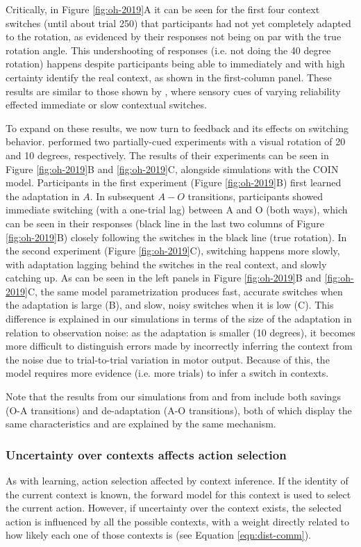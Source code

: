 \documentclass[a4paper,doc,floatsintext,natbib]{apa6}
\def \fref #1{Figure \ref{#1}}     %
\def \eref #1{Equation \ref{#1}}   %
\begin{document}
Critically, in \fref{fig:oh-2019}A it can be seen for the first four context switches (until about trial 250) that participants had not yet completely adapted to the rotation, as evidenced by their responses not being on par with the true rotation angle. This undershooting of responses (i.e. not doing the 40 degree rotation) happens despite participants being able to immediately and with high certainty identify the real context, as shown in the first-column panel. These results are similar to those shown by \cite{Imamizu_Explicit_2007}, where sensory cues of varying reliability effected immediate or slow contextual switches.

To expand on these results, we now turn to feedback and its effects on switching behavior. \cite{Oh_Minimizing_2019} performed two partially-cued experiments with a visual rotation of 20 and 10 degrees, respectively. The results of their experiments can be seen in \fref{fig:oh-2019}B and \ref{fig:oh-2019}C, alongside simulations with the COIN model. Participants in the first experiment (\fref{fig:oh-2019}B) first learned the adaptation in $A$. In subsequent $A - O$ transitions, participants showed immediate switching (with a one-trial lag) between A and O (both ways), which can be seen in their responses (black line in the last two columns of \fref{fig:oh-2019}B) closely following the switches in the black line (true rotation). In the second experiment (\fref{fig:oh-2019}C), switching happens more slowly, with adaptation lagging behind the switches in the real context, and slowly catching up. As can be seen in the left panels in \fref{fig:oh-2019}B and \ref{fig:oh-2019}C, the same model parametrization produces fast, accurate switches when the adaptation is large (B), and slow, noisy switches when it is low (C). This difference is explained in our simulations in terms of the size of the adaptation in relation to observation noise: as the adaptation is smaller (10 degrees), it becomes more difficult to distinguish errors made by incorrectly inferring the context from the noise due to trial-to-trial variation in motor output. Because of this, the model requires more evidence (i.e. more trials) to infer a switch in contexts.

Note that the results from our simulations from \cite{Oh_Minimizing_2019} and from \cite{Kim_Neural_2015} include both savings (O-A transitions) and de-adaptation (A-O transitions), both of which display the same characteristics and are explained by the same mechanism.

\subsubsection{Uncertainty over contexts affects action selection}
As with learning, action selection  affected by context inference. If the identity of the current context is known, the forward model for this context is used to select the current action. However, if uncertainty over the context exists, the selected action is influenced by all the possible contexts, with a weight directly related to how likely each one of those contexts is (see \eref{eqn:dist-comm}).
\end{document}
